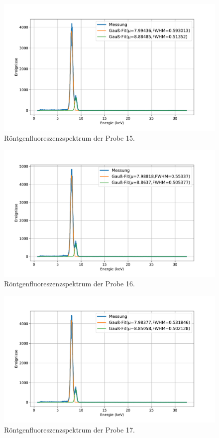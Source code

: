 \documentclass[
	a4paper,
	12pt,
	pagesize,
	ngerman
]{scrartcl}
\begin{document}
	\begin{figure}[H]
		\includegraphics[width=\textwidth]{images/15-X.pdf}
		\centering
		\caption{Röntgenfluoreszenzspektrum der Probe 15.}
	\end{figure}

	\begin{figure}[H]
		\includegraphics[width=\textwidth]{images/16-1-Cent.pdf}
		\centering
		\caption{Röntgenfluoreszenzspektrum der Probe 16.}
	\end{figure}

	\begin{figure}[H]
		\includegraphics[width=\textwidth]{images/17-X.pdf}
		\centering
		\caption{Röntgenfluoreszenzspektrum der Probe 17.}
	\end{figure}
\end{document}
